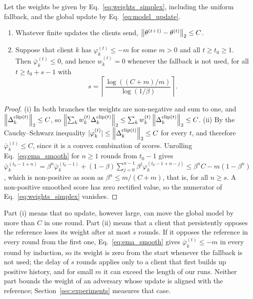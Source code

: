 \begin{proposition}
\label{prop:bounded_influence}
Let the weights be given by Eq.~\eqref{eq:weights_simplex}, including the uniform fallback, and the global update by Eq.~\eqref{eq:model_update}.
\begin{enumerate}[leftmargin=*, label=(\roman*)]
    \item Whatever finite updates the clients send, $\left\lVert \theta^{(t+1)} - \theta^{(t)} \right\rVert_2 \le C$.
    \item Suppose that client $k$ has $\varphi_k^{(t)} \le -m$ for some $m > 0$ and all $t \ge t_0 \ge 1$. Then $\bar{\varphi}_k^{(t)} \le 0$, and hence $w_k^{(t)} = 0$ whenever the fallback is not used, for all $t \ge t_0 + s - 1$ with
    \begin{equation}
    \label{eq:bounded_rounds}
    s = \left\lceil \frac{\log\left( (C + m)/m \right)}{\log(1/\beta)} \right\rceil .
    \end{equation}
\end{enumerate}
\end{proposition}
\begin{proof}
(i) In both branches the weights are non-negative and sum to one, and $\left\lVert \Delta_k^{\mathrm{clip}(t)} \right\rVert_2 \le C$, so $\left\lVert \sum_k w_k^{(t)} \Delta_k^{\mathrm{clip}(t)} \right\rVert_2 \le \sum_k w_k^{(t)} \left\lVert \Delta_k^{\mathrm{clip}(t)} \right\rVert_2 \le C$.
(ii) By the Cauchy--Schwarz inequality $|\varphi_k^{(t)}| \le \left\lVert \Delta_k^{\mathrm{clip}(t)} \right\rVert_2 \le C$ for every $t$, and therefore $\bar{\varphi}_k^{(t)} \le C$, since it is a convex combination of scores. Unrolling Eq.~\eqref{eq:ema_smooth} for $n \ge 1$ rounds from $t_0 - 1$ gives
$\bar{\varphi}_k^{(t_0 - 1 + n)} = \beta^{n} \bar{\varphi}_k^{(t_0-1)} + (1-\beta) \sum_{j=0}^{n-1} \beta^{j} \varphi_k^{(t_0 - 1 + n - j)} \le \beta^{n} C - m (1 - \beta^{n})$,
which is non-positive as soon as $\beta^{n} \le m/(C+m)$, that is, for all $n \ge s$. A non-positive smoothed score has zero rectified value, so the numerator of Eq.~\eqref{eq:weights_simplex} vanishes.
\end{proof}

Part (i) means that no update, however large, can move the global model by more than $C$ in one round. Part (ii) means that a client that persistently opposes the reference loses its weight after at most $s$ rounds. If it opposes the reference in every round from the first one, Eq.~\eqref{eq:ema_smooth} gives $\bar{\varphi}_k^{(t)} \le -m$ in every round by induction, so its weight is zero from the start whenever the fallback is not used; the delay of $s$ rounds applies only to a client that first builds up positive history, and for small $m$ it can exceed the length of our runs. Neither part bounds the weight of an adversary whose update is aligned with the reference; Section~\ref{sec:experiments} measures that case.

